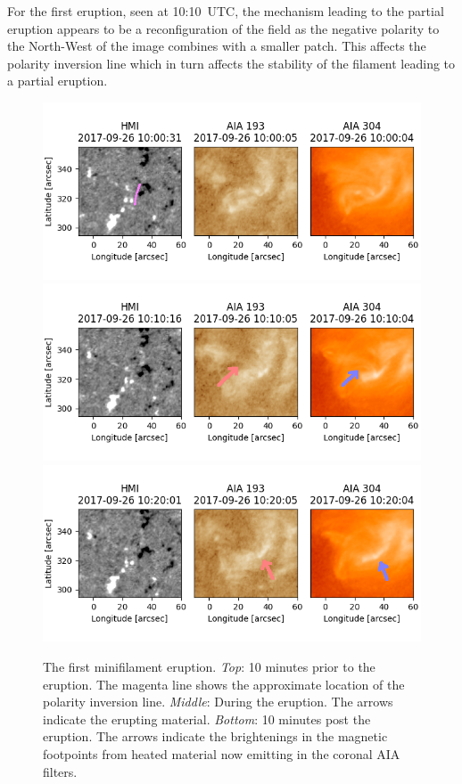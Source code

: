 For the first eruption, seen at 10:10~UTC, the mechanism leading to the partial eruption appears to be a reconfiguration of the field as the negative polarity to the North-West of the image combines with a smaller patch. This affects the polarity inversion line which in turn affects the stability of the filament leading to a partial eruption.
\begin{figure}
    \centering
    \includegraphics[width=.8\linewidth]{./04CBPs/figs/before1.png}
    \includegraphics[width=.8\linewidth]{./04CBPs/figs/during1_overlay.png}
    \includegraphics[width=.8\linewidth]{./04CBPs/figs/after1_overlay.png}
    \caption[The first minifilament eruption.]{The first minifilament eruption. \textit{Top}: 10 minutes prior to the eruption. The magenta line shows the approximate location of the polarity inversion line. \textit{Middle}: During the eruption. The arrows indicate the erupting material. \textit{Bottom}: 10 minutes post the eruption. The arrows indicate the brightenings in the magnetic footpoints from heated material now emitting in the coronal AIA filters.}
    \label{fil1}
\end{figure}
